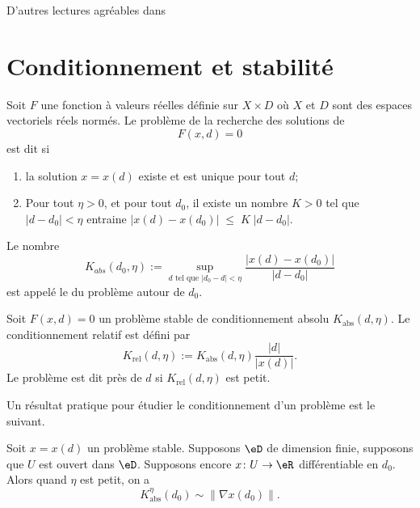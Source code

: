 
D'autres lectures agréables dans \cite{GianlucaB}

\section{Conditionnement et stabilité}

\begin{definition}
	Soit $F$ une fonction à valeurs réelles définie sur $X\times D$ où $X$ et $ D$ sont des espaces vectoriels réels normés. Le problème de la recherche des solutions de 
	\begin{equation}
		F(x,d)=0
	\end{equation}
	est dit  si 
	\begin{enumerate}
		\item 
			la solution $x=x(d)$ existe et est unique pour tout $d$;
		\item \label{ItemProbStableB}
			Pour tout $\eta>0$, et pour tout $d_0$, il existe un nombre $K>0$ tel que $|d-d_0|<\eta$ entraine $|x(d)-x(d_0)|\;\leq\;K\;|d-d_0|$.
	\end{enumerate}
\end{definition}
Le nombre 
\begin{equation}		\label{EqDefAABSOLU}
	K_{abs}(d_0,\eta):=\sup_{d\text{ tel que $|d_0-d|<\eta$}}\frac{|x(d)-x(d_0)|}{|d-d_0|}
\end{equation}
est appelé le  du problème autour de $d_0$.

\begin{definition}	
	Soit $F(x,d)=0$ un problème stable de conditionnement absolu $K_{\text{abs}}(d,\eta)$.  Le conditionnement relatif est défini par
	\begin{equation}
		K_{\text{rel}}(d,\eta):=K_{\text{abs}}(d,\eta)\frac{|d|}{|x(d)|}.
	\end{equation}
	Le problème est dit  près de $d$ si $K_{\text{rel}}(d,\eta)$ est petit.
\end{definition}

Un résultat pratique pour étudier le conditionnement d'un problème est le suivant.
\begin{corollary}		\label{CorConditionnementNormeNabla}
	Soit $x=x(d)$ un problème stable. Supposons $\eD$ de dimension finie, supposons que $U$ est ouvert dans $\eD$. Supposons encore $x\colon U\to \eR$ différentiable en $d_0$. Alors quand $\eta$ est petit, on a
	\begin{equation}
		K_{\text{abs}}^{\eta}(d_0)\sim \| \nabla x(d_0) \|.
	\end{equation}
\end{corollary}

